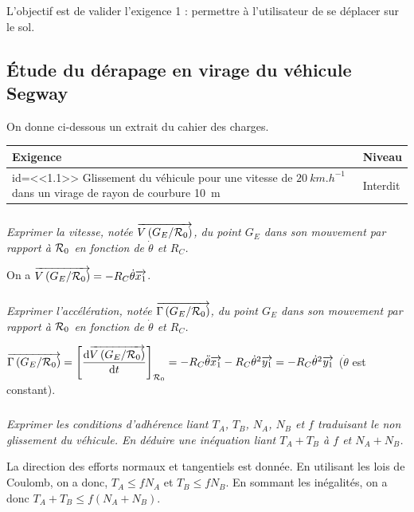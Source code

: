 \documentclass[10pt,fleqn]{article} %
\begin{document}
\begin{multicols}{2}
\begin{obj}
L'objectif est de valider l'exigence 1 : permettre à l'utilisateur de se déplacer sur le sol.
\end{obj}

\subsection*{Étude du dérapage en virage du véhicule Segway}
\ifprof

\else
On donne ci-dessous un extrait du cahier des charges.

\begin{center}
\begin{tabular}{|p{.7\linewidth}|p{.2\linewidth}|}
\hline 
Exigence & Niveau \\
\hline
id=<<1.1>> Glissement du véhicule pour une vitesse de $\SI{20}{km.h^{-1}}$ dans un virage de rayon de courbure \SI{10}{m} 
& Interdit \\
\hline
\end{tabular}
\end{center}

\fi
\subparagraph{}\textit{Exprimer la vitesse, notée  $\overrightarrow{V\left(G_E /\mathcal{R}_{0}\right)}$, du point $G_E$ dans son mouvement par rapport à $\mathcal{R}_{0}$ en fonction de $\dot{\theta}$ et $R_C$.}
\ifprof
\begin{corrige}
On a $\overrightarrow{V\left(G_E /\mathcal{R}_{0}\right)}=-R_C\dot{\theta}\overrightarrow{x_1}$.
\end{corrige}
\else
\fi

\subparagraph{}\textit{Exprimer l'accélération, notée  $\overrightarrow{\Gamma \left(G_E /\mathcal{R}_{0}\right)}$, du point $G_E$ dans son mouvement par rapport à $\mathcal{R}_{0}$ en fonction de $\dot{\theta}$ et $R_C$.}
\ifprof
\begin{corrige}
$\overrightarrow{\Gamma \left(G_E /\mathcal{R}_{0}\right)}=\left[\dfrac{\text{d} \overrightarrow{V\left(G_E /\mathcal{R}_{0}\right)}}{\text{d} t}\right]_{\mathcal{R}_{0}}= 
-R_C\ddot{\theta}\overrightarrow{x_1}-R_C\dot{\theta}^2\overrightarrow{y_1}=-R_C\dot{\theta}^2\overrightarrow{y_1}$ ($\dot{\theta}$ est constant).
\end{corrige}
\else
\fi


\subparagraph{}\textit{Exprimer les conditions d'adhérence liant $T_A$, $T_B$, $N_A$, $N_B$ et $f$ traduisant le non glissement du véhicule. En déduire une inéquation liant $T_A + T_B$ à $f$ et $N_A + N_B$.}
\ifprof
\begin{corrige}
La direction des efforts normaux et tangentiels est donnée. En utilisant les lois de Coulomb, on a donc, $T_A\leq fN_A$ et $T_B\leq fN_B$. En sommant les inégalités, on a donc $T_A+T_B\leq f\left(N_A+N_B\right)$.
\end{corrige}
\else
\fi


\end{multicols}
\end{document}
